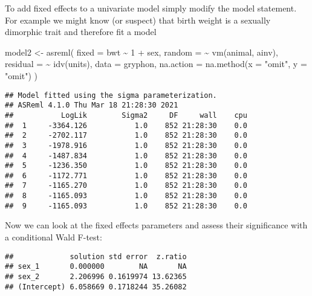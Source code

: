 \documentclass[
  12pt,
]{book}
\newenvironment{Shaded}{\begin{snugshade}}{\end{snugshade}}
\newcommand{\AttributeTok}[1]{\textcolor[rgb]{0.77,0.63,0.00}{#1}}
\newcommand{\ConstantTok}[1]{\textcolor[rgb]{0.00,0.00,0.00}{#1}}
\newcommand{\DecValTok}[1]{\textcolor[rgb]{0.00,0.00,0.81}{#1}}
\newcommand{\FunctionTok}[1]{\textcolor[rgb]{0.00,0.00,0.00}{#1}}
\newcommand{\NormalTok}[1]{#1}
\newcommand{\OtherTok}[1]{\textcolor[rgb]{0.56,0.35,0.01}{#1}}
\newcommand{\SpecialCharTok}[1]{\textcolor[rgb]{0.00,0.00,0.00}{#1}}
\newcommand{\StringTok}[1]{\textcolor[rgb]{0.31,0.60,0.02}{#1}}
\begin{document}
To add fixed effects to a univariate model simply modify the model statement. For example we might know (or suspect) that birth weight is a sexually dimorphic trait and therefore fit a model

\begin{Shaded}
\begin{Highlighting}[]
\NormalTok{model2 }\OtherTok{\textless{}{-}} \FunctionTok{asreml}\NormalTok{(}
  \AttributeTok{fixed =}\NormalTok{ bwt }\SpecialCharTok{\textasciitilde{}} \DecValTok{1} \SpecialCharTok{+}\NormalTok{ sex,}
  \AttributeTok{random =} \SpecialCharTok{\textasciitilde{}} \FunctionTok{vm}\NormalTok{(animal, ainv),}
  \AttributeTok{residual =} \SpecialCharTok{\textasciitilde{}} \FunctionTok{idv}\NormalTok{(units),}
  \AttributeTok{data =}\NormalTok{ gryphon,}
  \AttributeTok{na.action =} \FunctionTok{na.method}\NormalTok{(}\AttributeTok{x =} \StringTok{"omit"}\NormalTok{, }\AttributeTok{y =} \StringTok{"omit"}\NormalTok{)}
\NormalTok{)}
\end{Highlighting}
\end{Shaded}

\begin{verbatim}
## Model fitted using the sigma parameterization.
## ASReml 4.1.0 Thu Mar 18 21:28:30 2021
##           LogLik        Sigma2     DF     wall    cpu
##  1     -3364.126           1.0    852 21:28:30    0.0
##  2     -2702.117           1.0    852 21:28:30    0.0
##  3     -1978.916           1.0    852 21:28:30    0.0
##  4     -1487.834           1.0    852 21:28:30    0.0
##  5     -1236.350           1.0    852 21:28:30    0.0
##  6     -1172.771           1.0    852 21:28:30    0.0
##  7     -1165.270           1.0    852 21:28:30    0.0
##  8     -1165.093           1.0    852 21:28:30    0.0
##  9     -1165.093           1.0    852 21:28:30    0.0
\end{verbatim}

Now we can look at the fixed effects parameters and assess their significance with a conditional Wald F-test:

\begin{Shaded}
\end{Shaded}

\begin{verbatim}
##             solution std error  z.ratio
## sex_1       0.000000        NA       NA
## sex_2       2.206996 0.1619974 13.62365
## (Intercept) 6.058669 0.1718244 35.26082
\end{verbatim}
\end{document}
